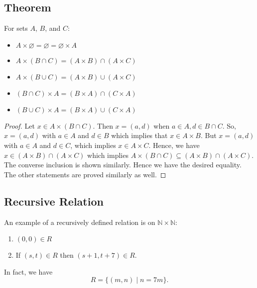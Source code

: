 \documentclass[11pt]{article}
\let\emptyset\varnothing
\begin{document}
    \subsection{Theorem}
    For sets $A$, $B$, and $C$:
    \begin{itemize}
        \item \(A \times \emptyset = \emptyset = \emptyset \times A\)
        \item \(A \times (B \cap C) = (A \times B) \cap (A \times C)\)
        \item \(A \times (B \cup C) = (A \times B) \cup (A \times C)\)
        \item \((B \cap C) \times A = (B \times A) \cap (C \times A)\)
        \item \((B \cup C) \times A = (B \times A) \cup (C \times A)\)
    \end{itemize}
    \begin{proof}
        Let \(x \in A \times (B \cap C)\). Then \(x = (a,d)\) when \(a \in A, d \in B \cap C\). So, \(x = (a,d)\) with \(a \in A\) and \(d \in B\) which implies that \(x \in A \times B.\) But \(x = (a,d)\) with \(a \in A\) and \(d \in C\), which implies \(x \in A \times C\). Hence, we have \(x \in (A \times B) \cap (A \times C)\) which implies \(A \times (B \cap C) \subseteq (A \times B) \cap (A \times C).\) The converse inclusion is shown similarly. Hence we have the desired equality. The other statements are proved similarly as well.
    \end{proof}

    \subsection{Recursive Relation}
    An example of a recursively defined relation is on \(\mathbb{N} \times \mathbb{N}\):
    \begin{enumerate}
        \item \((0,0) \in R\)
        \item If \((s,t) \in R\) then \((s+1, t+7) \in R\).
    \end{enumerate}
    In fact, we have \[R = \{(m,n) \mid n = 7m\}.\]
\end{document}
